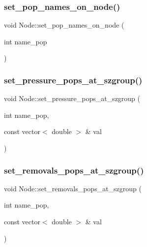 \mbox{\label{class_node_adf65aa34ec944d78e64ca64bc433a45b}} 
\subsubsection{\texorpdfstring{set\_pop\_names\_on\_node()}{set\_pop\_names\_on\_node()}}
{\footnotesize\ttfamily void Node\+::set\+\_\+pop\+\_\+names\+\_\+on\+\_\+node (\begin{DoxyParamCaption}\item[{int}]{name\+\_\+pop }\end{DoxyParamCaption})}

\mbox{\label{class_node_a6a6f91aea3d5f26cd99cbdfe9f8936c5}} 
\subsubsection{\texorpdfstring{set\_pressure\_pops\_at\_szgroup()}{set\_pressure\_pops\_at\_szgroup()}}
{\footnotesize\ttfamily void Node\+::set\+\_\+pressure\+\_\+pops\+\_\+at\+\_\+szgroup (\begin{DoxyParamCaption}\item[{int}]{name\+\_\+pop,  }\item[{const vector$<$ double $>$ \&}]{val }\end{DoxyParamCaption})}

\mbox{\label{class_node_aa32dfbdbf44af7b5691913b7cace5e66}} 
\subsubsection{\texorpdfstring{set\_removals\_pops\_at\_szgroup()}{set\_removals\_pops\_at\_szgroup()}}
{\footnotesize\ttfamily void Node\+::set\+\_\+removals\+\_\+pops\+\_\+at\+\_\+szgroup (\begin{DoxyParamCaption}\item[{int}]{name\+\_\+pop,  }\item[{const vector$<$ double $>$ \&}]{val }\end{DoxyParamCaption})}

